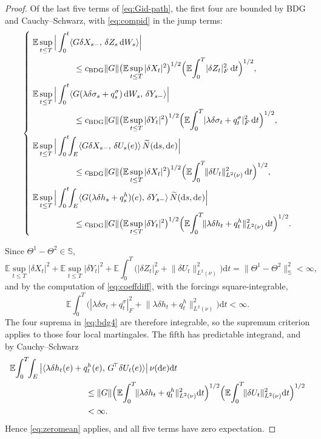 \documentclass[preprint,12pt]{elsarticle}
\newcommand{\E}{\mathbb{E}}
\newcommand{\diff}{\mathrm{d}}
\newcommand{\Nt}{\widetilde{N}}
\newcommand{\inner}[2]{\langle #1,\,#2\rangle}
\newcommand{\Lnu}{L^2(\nu)}
\newcommand{\Gstar}{G^{\!\top}}
\newcommand{\HH}{\mathbb{S}}
\newcommand{\Lnorm}[1]{\lVert #1\rVert_{\Lnu}}
\numberwithin{equation}{section}
\theoremstyle{plain}
\theoremstyle{definition}
\theoremstyle{\PaperRemarkStyle}
\begin{document}
\begin{proof}
Of the last five terms of \eqref{eq:Gid-path}, the first four are bounded by BDG and
Cauchy--Schwarz, with \eqref{eq:compid} in the jump terms:
\begin{equation}\label{eq:bdg4}
\left\{\;
\begin{aligned}
&\E\sup_{t\le T}\Big|\int_0^t\inner{G\delta X_{s-}}{\delta Z_s\,\diff W_s}\Big|\\
&\hspace{0.14\linewidth}\le c_{\mathrm{BDG}}\|G\|\big(\E\sup_{t\le T}|\delta X_t|^2\big)^{1/2}
\Big(\E\!\int_0^T\!|\delta Z_t|_F^2\,\diff t\Big)^{1/2},\\
&\E\sup_{t\le T}\Big|\int_0^t\inner{G(\lambda\delta\sigma_s+q^\sigma_s)\,\diff W_s}{\delta Y_{s-}}\Big|\\
&\hspace{0.14\linewidth}\le c_{\mathrm{BDG}}\|G\|\big(\E\sup_{t\le T}|\delta Y_t|^2\big)^{1/2}
\Big(\E\!\int_0^T\!|\lambda\delta\sigma_t+q^\sigma_t|_F^2\,\diff t\Big)^{1/2},\\
&\E\sup_{t\le T}\Big|\int_0^t\!\!\int_E\inner{G\delta X_{s-}}{\delta U_s(e)}\,\Nt(\diff s,\diff e)\Big|\\
&\hspace{0.14\linewidth}\le c_{\mathrm{BDG}}\|G\|\big(\E\sup_{t\le T}|\delta X_t|^2\big)^{1/2}
\Big(\E\!\int_0^T\!\Lnorm{\delta U_t}^2\,\diff t\Big)^{1/2},\\
&\E\sup_{t\le T}\Big|\int_0^t\!\!\int_E\inner{G(\lambda\delta h_s+q^h_s)(e)}{\delta Y_{s-}}\,\Nt(\diff s,\diff e)\Big|\\
&\hspace{0.14\linewidth}\le c_{\mathrm{BDG}}\|G\|\big(\E\sup_{t\le T}|\delta Y_t|^2\big)^{1/2}
\Big(\E\!\int_0^T\!\Lnorm{\lambda\delta h_t+q^h_t}^2\,\diff t\Big)^{1/2} .
\end{aligned}
\right.
\end{equation}

Since $\Theta^1-\Theta^2\in\HH$,
\[
\E\sup_{t\le T}|\delta X_t|^2+\E\sup_{t\le T}|\delta Y_t|^2
+\E\!\int_0^T\!\big(|\delta Z_t|_F^2+\Lnorm{\delta U_t}^2\big)\diff t
=\|\Theta^1-\Theta^2\|_{\HH}^2<\infty ,
\]
and by the computation of \eqref{eq:coeffdiff}, with the forcings square-integrable,
\[
\E\!\int_0^T\!\big(|\lambda\delta\sigma_t+q^\sigma_t|_F^2
+\Lnorm{\lambda\delta h_t+q^h_t}^2\big)\diff t<\infty .
\]
The four suprema in \eqref{eq:bdg4} are therefore integrable, so the supremum criterion
applies to those four local martingales. The fifth has predictable
integrand, and by Cauchy--Schwarz
\[
\begin{aligned}
&\E\!\int_0^T\!\!\int_E\big|\inner{\lambda\delta h_t(e)+q^h_t(e)}{\Gstar\delta U_t(e)}\big|\,\nu(\diff e)\diff t\\
&\hspace{0.26\linewidth}\le\|G\|\Big(\E\!\int_0^T\!\Lnorm{\lambda\delta h_t+q^h_t}^2\diff t\Big)^{1/2}
\Big(\E\!\int_0^T\!\Lnorm{\delta U_t}^2\diff t\Big)^{1/2}\\
&\hspace{0.26\linewidth}<\infty .
\end{aligned}
\]
Hence \eqref{eq:zeromean} applies, and all five terms have zero expectation.


\end{proof}
\end{document}
